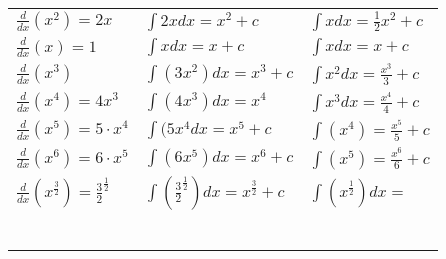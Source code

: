 \documentclass{article}
\begin{document}
  \begin{table}[]
\begin{tabular}{lll}
$\frac{d}{dx}(x^2)=2x$                                    & $\int 2x dx=x^2+c$                                     & $\int x dx=\frac{1}{2}x^2+c$    \\
$\frac{d}{dx}(x)=1$                                       & $\int x dx=x+c$                                        & $\int x dx= x+c$                \\
$\frac{d}{dx}(x^3)$                                       & $\int (3x^2) dx=x^3+c$                                 & $\int x^2 dx = \frac{x^3}{3}+c$ \\
$\frac{d}{dx}(x^4)=4x^3$                                  & $\int (4x^3) dx=x^4$                                   & $\int x^3 dx= \frac{x^4}{4}+c$  \\
$\frac{d}{dx}(x^5)=5\cdot x^4$                            & $\int (5x^4 dx=x^5+c$                                  & $\int (x^4) = \frac{x^5}{5}+c$  \\
$\frac{d}{dx}(x^6)=6\cdot x^5$                            & $\int (6x^5) dx=x^6+c$                                 & $\int (x^5)= \frac{x^6}{6}+c$   \\
$\frac{d}{dx}(x^{\frac{3}{2}})=\frac{3}{2}^{\frac{1}{2}}$ & $\int (\frac{3}{2}^{\frac{1}{2}})dx=x^{\frac{3}{2}}+c$ & $\int (x^{\frac{1}{2}}) dx =$   \\
                                                          &                                                        &                                 \\
                                                          &                                                        &                                 \\
                                                          &                                                        &                                 \\
                                                          &                                                        &                                 \\
                                                          &                                                        &                                 \\
                                                          &                                                        &                                
\end{tabular}
\end{table}
  

   
\end{document}
